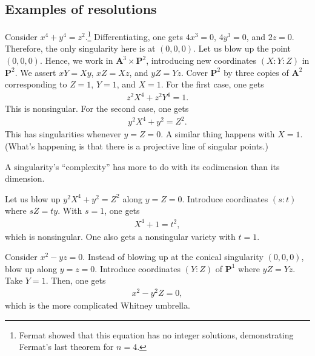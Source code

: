 \documentclass [11 pt, oneside, margin = 1 in] {article}
\begin{document}
\subsection{Examples of resolutions}
\begin{example}[ ]\label{}\text{}
Consider $x^4+y^4=z^2$.\footnote{Fermat showed that this equation has no integer solutions, demonstrating Fermat's last theorem for $n=4$.} Differentiating, one gets $4x^3=0$, $4y^3=0$, and $2z=0$. Therefore, the only singularity here is at $(0,0,0)$. Let us blow up the point $(0,0,0)$. Hence, we work in $\mathbf{A}^3\times \mathbf{P}^2$, introducing new coordinates $(X:Y:Z)$ in $\mathbf{P}^2$. We assert $xY=Xy$, $xZ=Xz$, and $yZ=Yz$. Cover $\mathbf{P}^2$ by three copies of $\mathbf{A}^2$ corresponding to $Z=1$, $Y=1$, and $X=1$. For the first case, one gets 
\begin{align*}
	z^2X^4+z^2Y^4=1.
\end{align*}
This is nonsingular. For the second case, one gets
\begin{align*}
	y^2X^4+y^2=Z^2.
\end{align*}
This has singularities whenever $y=Z=0$. A similar thing happens with $X=1$. (What's happening is that there is a projective line of singular points.)

\begin{remark}
	A singularity's ``complexity'' has more to do with its codimension than its dimension.
\end{remark}

Let us blow up $y^2X^4+y^2=Z^2$ along $y=Z=0$. Introduce coordinates $(s:t)$ where $sZ=ty$. With $s=1$, one gets 
\begin{align*}
	X^4 + 1=t^2,
\end{align*}
which is nonsingular. One also gets a nonsingular variety with $t=1$.
\end{example}


\begin{example}\label{}\text{}
Consider $x^2-yz=0$. Instead of blowing up at the conical singularity $(0,0,0)$, blow up along $y=z=0$. Introduce coordinates $(Y:Z)$ of $\mathbf{P}^1$ where $yZ=Yz$. Take $Y=1$. Then, one gets
\begin{align*}
	x^2-y^2Z=0,
\end{align*}
which is the more complicated Whitney umbrella.
\end{example}
\end{document}
